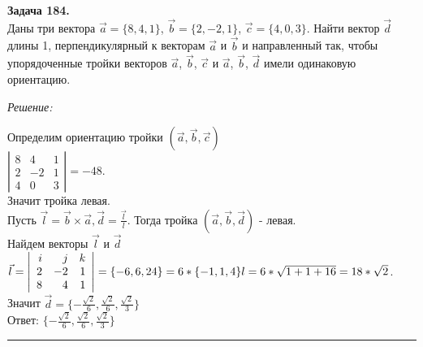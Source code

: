 \documentclass[a4paper, 12pt]{article}
\newenvironment{problem}[2][Задача]
    { \begin{mdframed}[backgroundcolor=gray!10] \textbf{#1 #2.} \\}
    {  \end{mdframed}}
\newenvironment{solution}
    {\textit{Решение: }}
    {\noindent\rule{7in}{1.5pt}}
\begin{document}
\begin{problem}{184}
Даны три вектора $\vec{a}=\{8,4,1\}$, $\vec{b}=\{2,-2,1\}$, $\vec{c}=\{4,0,3\}$.
Найти вектор $\vec d$ длины 1, перпендикулярный к векторам $\vec a$ и $\vec b$ и направленный так, чтобы упорядоченные
тройки векторов $\vec a$, $\vec b$, $\vec c$ и  $\vec a$, $\vec b$, $\vec d$ имели одинаковую ориентацию.
\end{problem}
\begin{solution}

Определим ориентацию тройки $(\vec{a}, \vec{b}, \vec{c})$ \\
$
\left|
  \begin{array}{rrr}
    8 & 4 & 1 \\
    2 & -2 & 1 \\
    4 & 0 & 3
  \end{array}
\right|
= -48
$. \\
Значит тройка левая. \\
Пусть
$
\vec{l} = \vec{b} \times \vec{a}, \vec{d} = \frac{\vec{l}}{l}
$.
Тогда тройка $(\vec{a}, \vec{b}, \vec{d})$ - левая. \\
Найдем векторы $\vec{l}$ и $\vec{d}$ \\
$
\vec{l} =
\left|
  \begin{array}{rrr}
    i & j & k \\
    2 & -2 & 1 \\
    8 & 4 & 1
  \end{array}
\right|
=
\{-6, 6, 24\} = 6 * \{-1, 1, 4\} \\
l = 6 * \sqrt{1 + 1 + 16} = 18 * \sqrt{2}
$. \\
Значит $\vec{d} = \{-\frac{\sqrt{2}}{6}, \frac{\sqrt{2}}{6}, \frac{\sqrt{2}}{3}\}$ \\
Ответ: $\{-\frac{\sqrt{2}}{6}, \frac{\sqrt{2}}{6}, \frac{\sqrt{2}}{3}\}$

\end{solution}
\end{document}

